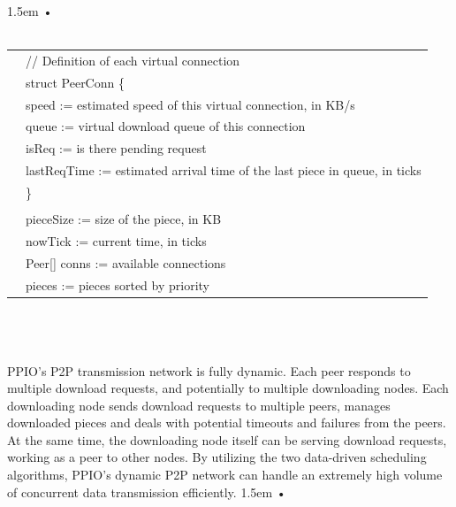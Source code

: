 \documentclass[10pt,a4paper]{article}
\begin{document}
\hangindent 1.5em
\noindent   
•
\vspace{-0.3em}
\\\\
\begin{tabular}{r|l}
\quad  & // Definition of each virtual connection  \\
\quad  & struct PeerConn \{   \\ 
 \quad &\qquad speed := estimated speed of this virtual connection, in KB/s  \\ 
 \quad &\qquad queue := virtual download queue of this connection     \\ 
 \quad &\qquad isReq := is there pending request    \\ 
 \quad &\qquad lastReqTime := estimated arrival time of the last piece in queue, in ticks   \\ 
 \quad &\}   \\ 
\\ 
\quad	&pieceSize := size of the piece, in KB  \\ 
\quad	&nowTick := current time, in ticks   \\ 
\quad	&Peer[] conns := available connections   \\
	&pieces := pieces sorted by priority   \\
\end{tabular}
\vspace{-0.5em}
\\\\\\
\noindent   
PPIO's P2P transmission network is fully dynamic. Each peer responds to multiple download requests, and potentially to multiple downloading nodes. Each downloading node sends download requests to multiple peers, manages downloaded pieces and deals with potential timeouts and failures from the peers. At the same time, the downloading node itself can be serving download requests, working as a peer to other nodes. By utilizing the two data-driven scheduling algorithms, PPIO's dynamic P2P network can handle an extremely high volume of concurrent data transmission efficiently.
\vspace{-0.7em}
\newpage 
{}
\hangindent 1.5em
\noindent   
•\\
\vspace{-1em}
\end{document}
